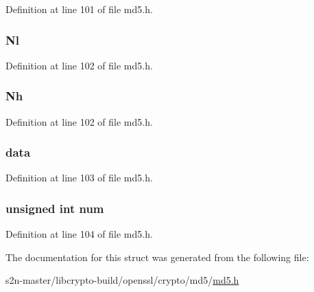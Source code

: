 Definition at line 101 of file md5.\+h.

\subsubsection[{\texorpdfstring{Nl}{Nl}}]{ Nl}\hypertarget{struct_m_d5state__st_a4fa58b55fcc2cd73bfbda1b166243a97}{}\label{struct_m_d5state__st_a4fa58b55fcc2cd73bfbda1b166243a97}


Definition at line 102 of file md5.\+h.

\subsubsection[{\texorpdfstring{Nh}{Nh}}]{ Nh}\hypertarget{struct_m_d5state__st_a7362a80e3b02c14730028378a8207cc3}{}\label{struct_m_d5state__st_a7362a80e3b02c14730028378a8207cc3}


Definition at line 102 of file md5.\+h.

\subsubsection[{\texorpdfstring{data}{data}}]{ data}\hypertarget{struct_m_d5state__st_ab9756be3f7c4e126da5d969bccfda0ee}{}\label{struct_m_d5state__st_ab9756be3f7c4e126da5d969bccfda0ee}


Definition at line 103 of file md5.\+h.

\subsubsection[{\texorpdfstring{num}{num}}]{\setlength{\rightskip}{0pt plus 5cm}unsigned int num}\hypertarget{struct_m_d5state__st_a41ddefd3473727cad32a9767c10faed8}{}\label{struct_m_d5state__st_a41ddefd3473727cad32a9767c10faed8}


Definition at line 104 of file md5.\+h.



The documentation for this struct was generated from the following file\+:\begin{DoxyCompactItemize}
\item 
s2n-\/master/libcrypto-\/build/openssl/crypto/md5/\hyperlink{crypto_2md5_2md5_8h}{md5.\+h}\end{DoxyCompactItemize}
